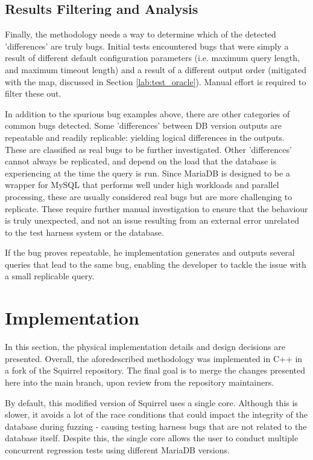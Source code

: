 \documentclass[sigconf]{acmart}
\begin{document}
\subsection{Results Filtering and Analysis}
\label{lab:results_filtering}
Finally, the methodology needs a way to determine which of the detected 'differences' are truly bugs. Initial tests encountered bugs that were simply a result of different default configuration parameters (i.e. maximum query length, and maximum timeout length) and a result of a different output order (mitigated with the map, discussed in Section \ref{lab:test_oracle}). Manual effort is required to filter these out.

In addition to the spurious bug examples above, there are other categories of common bugs detected. Some 'differences' between DB version outputs are repeatable and readily replicable: yielding logical differences in the outputs. These are classified as real bugs to be further investigated. Other 'differences' cannot always be replicated, and depend on the load that the database is experiencing at the time the query is run. Since MariaDB is designed to be a wrapper for MySQL that performs well under high workloads and parallel processing, these are usually considered real bugs but are more challenging to replicate. These require further manual investigation to ensure that the behaviour is truly unexpected, and not an issue resulting from an external error unrelated to the test harness system or the database.

If the bug proves repeatable, he implementation generates and outputs several queries that lead to the same bug, enabling the developer to tackle the issue with a small replicable query.





\section{Implementation}
\label{lab:implementation}
In this section, the physical implementation details and design decisions are presented. Overall, the aforedescribed methodology was implemented in C++ in a fork of the Squirrel repository. The final goal is to merge the changes presented here into the main branch, upon review from the repository maintainers. 

By default, this modified version of Squirrel uses a single core. Although this is slower, it avoids a lot of the race conditions that could impact the integrity of the database during fuzzing - causing testing harness bugs that are not related to the database itself. Despite this, the single core allows the user to conduct multiple concurrent regression tests using different MariaDB versions.
\end{document}

